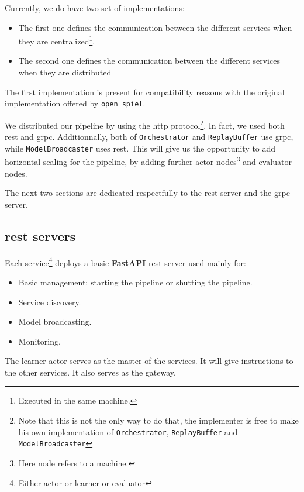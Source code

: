 Currently, we do have two set of implementations:
\begin{itemize}
	\item The first one defines the communication between the different services when they are centralized\footnote{Executed in the same machine.}.
	\item The second one defines the communication between the different services when they are distributed
\end{itemize}
The first implementation is present for compatibility reasons with the original implementation offered by \texttt{open\_spiel}. 

We distributed our pipeline by using the \acrshort{http} protocol\footnote{Note that this is not the only way to do that, the implementer is free to make his own implementation of \texttt{Orchestrator}, \texttt{ReplayBuffer} and \texttt{ModelBroadcaster}}. In fact, we used both \acrshort{rest} and \acrshort{grpc}.
Additionnally, both of \texttt{Orchestrator} and \texttt{ReplayBuffer} use \acrshort{grpc}, while \texttt{ModelBroadcaster} uses \acrshort{rest}. This will give us the opportunity to add horizontal scaling for the pipeline, by adding further actor nodes\footnote{Here node refers to a machine.} and evaluator nodes.

The next two sections are dedicated respectfully to the \acrshort{rest} server and the \acrshort{grpc} server.
\subsection{\acrshort{rest} servers}
Each service\footnote{Either actor or learner or evaluator} deploys a basic \textbf{FastAPI} \acrfull{rest} server used mainly for: 
\begin{itemize}
	\item Basic management: starting the pipeline or shutting the pipeline.
	\item Service discovery.
	\item Model broadcasting.
	\item Monitoring.
\end{itemize}
The learner actor serves as the master of the services. It will give instructions to the other services. It also serves as the gateway.

